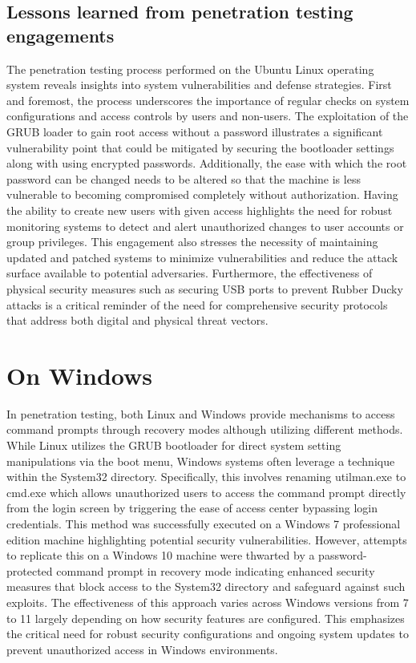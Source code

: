 \documentclass[manuscript,acmsmall,anonymous,review,screen,nonacm=true, authorversion=true]{acmart}
\begin{document}
\subsection{Lessons learned from penetration testing engagements}
The penetration testing process performed on the Ubuntu Linux operating system reveals insights into system vulnerabilities and defense strategies. First and foremost, the process underscores the importance of regular checks on system configurations and access controls by users and non-users. The exploitation of the GRUB loader to gain root access without a password illustrates a significant vulnerability point that could be mitigated by securing the bootloader settings along with using encrypted passwords. Additionally, the ease with which the root password can be changed needs to be altered so that the machine is less vulnerable to becoming compromised completely without authorization. Having the ability to create new users with given access highlights the need for robust monitoring systems to detect and alert unauthorized changes to user accounts or group privileges. This engagement also stresses the necessity of maintaining updated and patched systems to minimize vulnerabilities and reduce the attack surface available to potential adversaries. Furthermore, the effectiveness of physical security measures such as securing USB ports to prevent Rubber Ducky attacks is a critical reminder of the need for comprehensive security protocols that address both digital and physical threat vectors.

\section{On Windows}
In penetration testing, both Linux and Windows provide mechanisms to access command prompts through recovery modes although utilizing different methods. While Linux utilizes the GRUB bootloader for direct system setting manipulations via the boot menu, Windows systems often leverage a technique within the System32 directory. Specifically, this involves renaming utilman.exe to cmd.exe which allows unauthorized users to access the command prompt directly from the login screen by triggering the ease of access center bypassing login credentials. This method was successfully executed on a Windows 7 professional edition machine highlighting potential security vulnerabilities. However, attempts to replicate this on a Windows 10 machine were thwarted by a password-protected command prompt in recovery mode indicating enhanced security measures that block access to the System32 directory and safeguard against such exploits. The effectiveness of this approach varies across Windows versions from 7 to 11 largely depending on how security features are configured. This emphasizes the critical need for robust security configurations and ongoing system updates to prevent unauthorized access in Windows environments.
\end{document}
